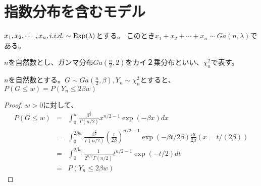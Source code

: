 \section{指数分布を含むモデル}

\begin{theo}
    $x_1,x_2,\cdots,x_n,i.i.d. \sim \rm{Exp}(\lambda)$とする。
    このとき$x_1+x_2+\cdots+x_n \sim Ga(n,\lambda)$である。
\end{theo}

$n$を自然数とし、ガンマ分布$Ga(\frac{n}{2},2)$をカイ２乗分布といい、$\chi ^2_n$で表す。

\begin{theo}
$n$を自然数とする。$G\sim Ga(\frac{n}{2},\beta),Y_n\sim \chi^2_n$とすると、$P(G\leq w) = P(Y_n \leq 2\beta w)$
\end{theo}
\begin{proof}
$w >0$に対して、
\begin{eqnarray*}
    P(G \leq w) &=& \int_0^w \frac{\beta^\frac{n}{2}}{\Gamma(n/2)}x^{n/2-1}\exp{(-\beta x)}dx \\
    &=&\int_0^{2\beta w} \frac{\beta^{\frac{n}{2}}}{\Gamma(n/2)}\left( \frac{t}{2\beta} \right)^{n/2-1}\exp{(-\beta t/2\beta)}\frac{dt}{2\beta} (x=t/(2\beta)) \\
    &=& \int_0^{2\beta w} \frac{1}{2^{n/2}\Gamma(n/2)}t^{n/2-1}\exp{(-t/2)}dt\\
    &=&P(Y_n \leq 2\beta w)
\end{eqnarray*}
\end{proof}

